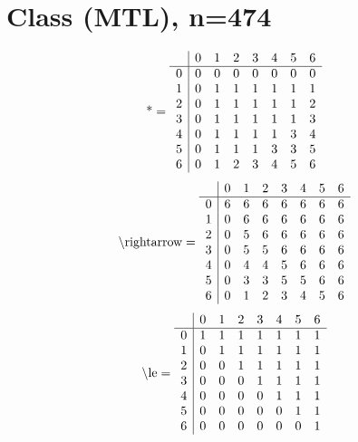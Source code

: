 \documentclass[11pt]{article}
\begin{document}
\section{Class (MTL), n=474}
\[\text{*} = 
\begin{array}{r | r r r r r r r}
 & 0 & 1 & 2 & 3 & 4 & 5 & 6 \\ \hline
0 & 0 & 0 & 0 & 0 & 0 & 0 & 0 \\
1 & 0 & 1 & 1 & 1 & 1 & 1 & 1 \\
2 & 0 & 1 & 1 & 1 & 1 & 1 & 2 \\
3 & 0 & 1 & 1 & 1 & 1 & 1 & 3 \\
4 & 0 & 1 & 1 & 1 & 1 & 3 & 4 \\
5 & 0 & 1 & 1 & 1 & 3 & 3 & 5 \\
6 & 0 & 1 & 2 & 3 & 4 & 5 & 6 \\
\end{array}
\]
\[\text{\textbackslash rightarrow} = 
\begin{array}{r | r r r r r r r}
 & 0 & 1 & 2 & 3 & 4 & 5 & 6 \\ \hline
0 & 6 & 6 & 6 & 6 & 6 & 6 & 6 \\
1 & 0 & 6 & 6 & 6 & 6 & 6 & 6 \\
2 & 0 & 5 & 6 & 6 & 6 & 6 & 6 \\
3 & 0 & 5 & 5 & 6 & 6 & 6 & 6 \\
4 & 0 & 4 & 4 & 5 & 6 & 6 & 6 \\
5 & 0 & 3 & 3 & 5 & 5 & 6 & 6 \\
6 & 0 & 1 & 2 & 3 & 4 & 5 & 6 \\
\end{array}
\]
\[\text{\textbackslash le} = 
\begin{array}{r | r r r r r r r}
 & 0 & 1 & 2 & 3 & 4 & 5 & 6 \\ \hline
0 & 1 & 1 & 1 & 1 & 1 & 1 & 1 \\
1 & 0 & 1 & 1 & 1 & 1 & 1 & 1 \\
2 & 0 & 0 & 1 & 1 & 1 & 1 & 1 \\
3 & 0 & 0 & 0 & 1 & 1 & 1 & 1 \\
4 & 0 & 0 & 0 & 0 & 1 & 1 & 1 \\
5 & 0 & 0 & 0 & 0 & 0 & 1 & 1 \\
6 & 0 & 0 & 0 & 0 & 0 & 0 & 1 \\
\end{array}
\]
\end{document}
